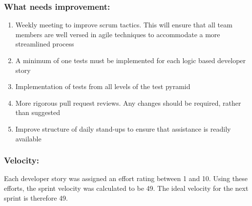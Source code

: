 \documentclass[10pt,onecolumn]{witseiepaper}
\begin{document}
\subsubsection*{What needs improvement:}
\begin{enumerate}
	\item Weekly meeting to improve scrum tactics. This will ensure that all team members are well versed in agile techniques to accommodate a more streamlined process
	\item A minimum of one tests must be implemented for each logic based developer story 
	\item Implementation of tests from all levels of the test pyramid
	\item More rigorous pull request reviews. Any changes should be required, rather than suggested
	\item Improve structure of daily stand-ups to ensure that assistance is readily available 
\end{enumerate}

\subsubsection*{Velocity:}
Each developer story was assigned an effort rating between 1 and 10. Using these efforts, the sprint velocity was calculated to be 49. The ideal velocity for the next sprint is therefore 49.
\end{document}
